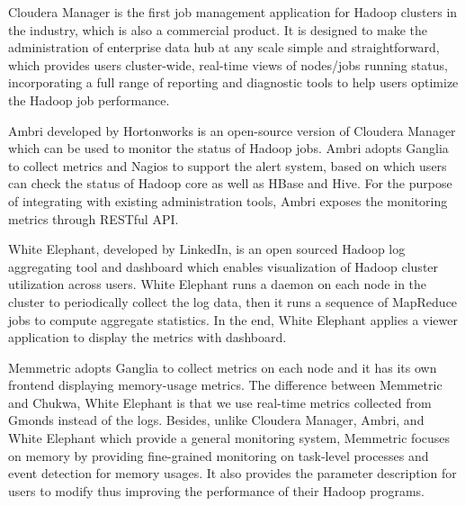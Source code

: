 Cloudera Manager\cite{http://www.cloudera.com} is the first job management application for Hadoop clusters in the industry, which is also a commercial product.
It is designed to make the administration of enterprise data hub at any scale simple and straightforward, which provides users cluster-wide, real-time views of nodes/jobs running status, incorporating a full range of reporting and diagnostic tools to help users optimize the Hadoop job performance.

Ambri\cite{http://hortonworks.com/hadoop/ambari} developed by Hortonworks is an open-source version of Cloudera Manager which can be used to monitor the status of Hadoop jobs.
Ambri adopts Ganglia to collect metrics and Nagios to support the alert system, based on which users can check the status of Hadoop core as well as HBase and Hive\cite{https://hive.apache.org}.
For the purpose of integrating with existing administration tools, Ambri exposes the monitoring metrics through RESTful API.
\par
White Elephant\cite{http://data.linkedin.com/opensource/white-elephant}, developed by LinkedIn, is an open sourced Hadoop log aggregating tool and dashboard which enables visualization of Hadoop cluster utilization across users. 
White Elephant runs a daemon on each node in the cluster to periodically collect the log data, then it runs a sequence of MapReduce jobs to compute aggregate statistics. In the end, White Elephant applies a viewer application to display the metrics with dashboard.
\par
Memmetric adopts Ganglia to collect metrics on each node and it has its own frontend displaying memory-usage metrics. The difference between Memmetric and Chukwa, White Elephant is that we use real-time metrics collected from Gmonds instead of the logs. Besides, unlike Cloudera Manager, Ambri, and White Elephant which provide a general monitoring system, Memmetric focuses on memory by providing fine-grained monitoring on task-level processes and event detection for memory usages. It also provides the parameter description for users to modify thus improving the performance of their Hadoop programs.


